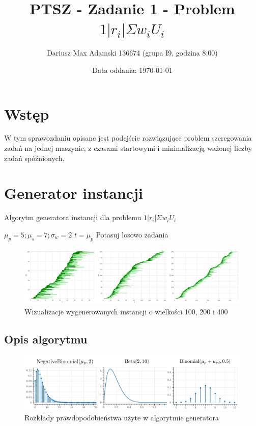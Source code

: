 \documentclass[11pt]{article}
\title{PTSZ - Zadanie 1 - Problem $1|r_i|\Sigma w_i U_i$}
\author{Dariusz Max Adamski 136674 (grupa I9, godzina 8:00)}
\affil{dariusz.adamski@student.put.poznan.pl}
\date{Data oddania: \today}
\begin{document}
\maketitle

\section*{Wstęp}

W tym sprawozdaniu opisane jest podejście rozwiązujące problem szeregowania zadań na jednej maszynie, z czasami startowymi i minimalizacją ważonej liczby zadań spóźnionych.

\section{Generator instancji}

\begin{algorithm}
\caption{Algorytm generatora instancji dla problemu $1|r_i|\Sigma w_i U_i$}
$\mu_p = 5; \mu_s = 7; \sigma_w = 2$ \;
$t = \mu_p$ \;
Potasuj losowo zadania
\end{algorithm}

\begin{figure}[b]
\caption{Wizualizacje wygenerowanych instancji o wielkości 100, 200 i 400}
\includegraphics[width=\textwidth]{inst.png}
\centering
\end{figure}

\subsection{Opis algorytmu}

\begin{figure}[t]
\caption{Rozkłady prawdopodobieństwa użyte w algorytmie generatora}
\includegraphics[width=\textwidth]{dist.png}
\centering
\end{figure}
\end{document}
